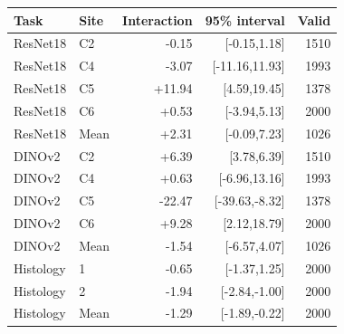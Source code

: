\begingroup\small\setlength{\tabcolsep}{4pt}
\begin{longtable}{llrrr}
\toprule
Task & Site & Interaction & 95\% interval & Valid \\ \midrule
ResNet18 & C2 & -0.15 & [-0.15,1.18] & 1510 \\
ResNet18 & C4 & -3.07 & [-11.16,11.93] & 1993 \\
ResNet18 & C5 & +11.94 & [4.59,19.45] & 1378 \\
ResNet18 & C6 & +0.53 & [-3.94,5.13] & 2000 \\
ResNet18 & Mean & +2.31 & [-0.09,7.23] & 1026 \\
DINOv2 & C2 & +6.39 & [3.78,6.39] & 1510 \\
DINOv2 & C4 & +0.63 & [-6.96,13.16] & 1993 \\
DINOv2 & C5 & -22.47 & [-39.63,-8.32] & 1378 \\
DINOv2 & C6 & +9.28 & [2.12,18.79] & 2000 \\
DINOv2 & Mean & -1.54 & [-6.57,4.07] & 1026 \\
Histology & 1 & -0.65 & [-1.37,1.25] & 2000 \\
Histology & 2 & -1.94 & [-2.84,-1.00] & 2000 \\
Histology & Mean & -1.29 & [-1.89,-0.22] & 2000 \\
\bottomrule\end{longtable}\endgroup
